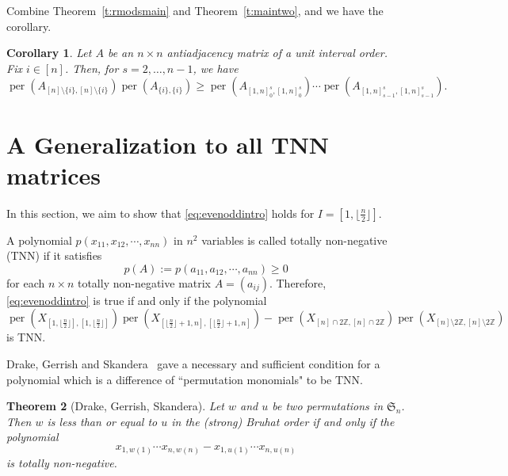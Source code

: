 \documentclass[12pt]{amsart}
\newtheorem{thm}{Theorem}[section]
\newtheorem{cor}[thm]{Corollary}
\theoremstyle{definition}
\numberwithin{equation}{section}
\newcommand{\sn}{\mathfrak{S}_n}
\newcommand{\defeq}{:=}
\DeclareMathOperator{\perm}{per}
\begin{document}
Combine Theorem~\ref{t:rmodsmain} and Theorem~\ref{t:maintwo}, and we have the corollary.
\begin{cor}
    Let $A$ be an $n\times n$ antiadjacency matrix of a unit interval order. Fix $i \in [n]$. Then, for $s=2,\dotsc,n-1$, we have \begin{equation*}
        \perm(A_{[n]\setminus\{i\},[n]\setminus\{i\}})\perm(A_{\{i\},\{i\}}) \geq \perm(A_{[1,n]_0^s,[1,n]_0^s})\cdots \perm(A_{[1,n]_{s-1}^s,[1,n]_{s-1}^s}).
    \end{equation*}
\end{cor}


\section{A Generalization to all TNN matrices}\label{s:A gen on all}

In this section, we aim to show that \eqref{eq:evenoddintro} holds for $I = [1,\lfloor \frac{n}{2} \rfloor]$.

A polynomial $p(x_{11}, x_{12},\cdots, x_{nn})$ in $n^2$ variables is called totally non-negative (TNN) if it satisfies
\begin{equation}\label{eq:TNNpolydef}
    p(A)\defeq p(a_{11}, a_{12},\cdots, a_{nn}) \geq 0
\end{equation}
for each $n\times n$ totally non-negative matrix $A=(a_{ij})$. Therefore, \eqref{eq:evenoddintro} is true if and only if the polynomial \begin{equation}\label{TNNpoly}
    \perm(X_{[1,\lfloor \frac{n}{2} \rfloor],[1,\lfloor \frac{n}{2} \rfloor]}) \perm(X_{[\lfloor \frac{n}{2} \rfloor +1,n],[\lfloor \frac{n}{2} \rfloor +1,n]}) - \perm(X_{[n]\cap 2\mathbb Z , [n]\cap 2\mathbb Z})\perm(X_{[n]\setminus 2\mathbb Z , [n]\setminus 2\mathbb Z})
\end{equation} is TNN.

Drake, Gerrish and Skandera~\cite{DGSBruhat} gave a necessary and sufficient condition for a polynomial which is a difference of ``permutation monomials" to be TNN.

\begin{thm}[Drake, Gerrish, Skandera]\label{pairing test}
            Let $w$ and $u$ be two permutations in $\sn$. Then $w$ is less than or equal to $u$ in the (strong) Bruhat order if and only if the polynomial \[x_{1,w(1)} \cdots x_{n,w(n)} - x_{1,u(1)} \cdots x_{n,u(n)}\] is totally non-negative.
\end{thm}
\end{document}
